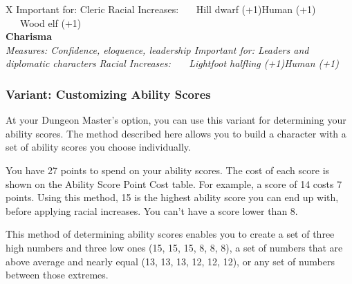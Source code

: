 \begin{DndTable}[header=Ability Score Summary]{X}
{    Important for: Cleric \newline
    Racial Increases: \newline
    \ \ \ Hill dwarf (+1)\tab Human (+1) \newline
    \ \ \ Wood elf (+1)
    \newline } \\
   \textbf{Charisma} \\
  \hiderowcolors \textit{Measures: Confidence, eloquence, leadership \newline
    Important for: Leaders and diplomatic characters \newline
    Racial Increases: \newline
    \ \ \ Lightfoot halfling (+1)\tab Human (+1) \newline
    \newline }
\end{DndTable}

\subsubsection{Variant: Customizing Ability Scores}
At your Dungeon Master’s option, you can use this variant for determining your ability scores. The method described here allows you to build a character with a set of ability scores you choose individually.

You have 27 points to spend on your ability scores. The cost of each score is shown on the Ability Score Point Cost table. For example, a score of 14 costs 7 points. Using this method, 15 is the highest ability score you can end up with, before applying racial increases. You can’t have a score lower than 8.

This method of determining ability scores enables you to create a set of three high numbers and three low ones (15, 15, 15, 8, 8, 8), a set of numbers that are above average and nearly equal (13, 13, 13, 12, 12, 12), or any set of numbers between those extremes.

